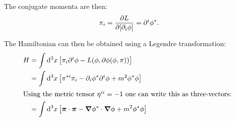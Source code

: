 \documentclass[11pt, ngerman, fleqn, DIV=15, headinclude, BCOR=1cm]{scrartcl}
\begin{document}
The conjugate momenta are then:
\[
    \pi_i = \frac{\partial {L}}{\partial {[\partial_i \phi]}} = \partial^i \phi^*.
\]


The Hamiltonian can then be obtained using a Legendre transformation:
\begin{align*}
    H
    &= \int \dif^3 x \sbr{\pi_i \partial^i \phi - L(\phi, \partial \phi(\phi,
\pi))} \\
    &= \int \dif^3 x \sbr{\pi^{*i} \pi_i - \partial_i \phi^* \partial^i \phi +
m^2 \phi^* \phi} \\
    \intertext{%
        Using the metric tensor $\eta^{ii} = -1$ one can write this as
        three-vectors:
    }
    &= \int \dif^3 x \sbr{\vec\pi \cdot \vec\pi - \vnabla \phi^* \cdot
\vnabla \phi + m^2 \phi^* \phi} \\
\end{align*}
\end{document}
